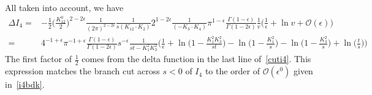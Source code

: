 \iffalse
In terms of the kinematic invariants
\begin{equation}
\begin{split}
v= &
\frac{1}{2}\Big( 1 - \frac{1}{K_3\cdot K_4}\frac{K_{12}^2}{K_{12}\cdot K_2}\big(K_2\cdot K_3\big) - \frac{(K_3\cdot K_{12})(K_2\cdot K_{12})}{K_{12}^2} \Big)
\\
= &
\frac{1}{2}\frac{1}{(K_3\cdot K_4)(K_1\cdot K_2)}
\Big( \frac{1}{2}K_3^2 (K_{12}- K_1^2) - K_{12}^2(K_2\cdot K_3)
\Big)
\\
=&
\frac{1}{(2K_3\cdot K_4)(2K_1\cdot K_2)}\big(K_{12}^2K_{14}^2 - K_1^2K_3^2\big)
\\
 = &
\frac{st - K_1^2K_3^2}{(s-K_1^2)(s-K_3^2)}
\end{split}
\end{equation}
\fi
%
All taken into account, we have
\begin{equation}
\begin{split}
\Delta I_4 = & -\frac{1}{2}\big(\frac{K_{12}^0}{2}\big)^{2-2\epsilon}\frac{1}{(2\pi)^{2-2\epsilon}}\frac{1}{s (K_{12}\cdot K_2)}2^{1-2\epsilon}\frac{1}{(-K_3\cdot K_4)}\pi^{1-\epsilon} \frac{\Gamma(1-\epsilon)}{\Gamma(1-2\epsilon)}
\frac{1}{v}\Big(\frac{1}{\epsilon} + \ln v + \mathcal{O}(\epsilon)\Big)
\\
= & 4^{-1+\epsilon}\pi^{-1+\epsilon}\frac{\Gamma(1-\epsilon)}{\Gamma(1-2\epsilon)}s^{-\epsilon}\frac{1}{st - K_1^2K_3^2}\Big(
\frac{1}{\epsilon} + \ln\big(1-\frac{K_1^2K_3^2}{st}\big)
-\ln\big(1-\frac{K_1^2}{s}\big) - \ln\big(1-\frac{K_3^2}{s}\big) + \ln\big(\frac{t}{s}\big)\Big)
\end{split}
\end{equation}
The first factor of $\frac{1}{2}$ comes from the delta function in the last line of~\cref{cuti4}.
This expression matches the branch cut across $s < 0 $ of $I_4$ to the order of $\mathcal{O}(\epsilon^0)$ given in~\cref{i4bdk}. \\\\
